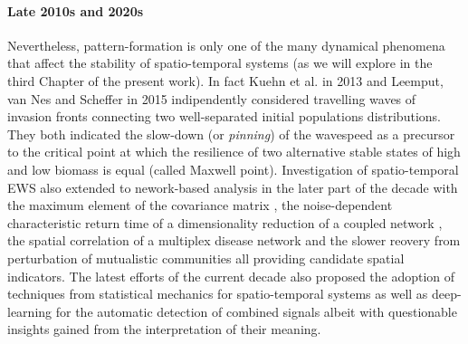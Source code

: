 \documentclass[../main.tex]{subfiles}
\begin{document}
\paragraph{Late 2010s and 2020s}
Nevertheless, pattern-formation is only one of the many dynamical phenomena that affect the stability of spatio-temporal systems (as we will explore in the third Chapter of the present work). 
In fact Kuehn et al. in 2013 \cite{Kuehn13} and Leemput, van Nes and Scheffer in 2015 \cite{Leemput15} indipendently considered travelling waves of invasion fronts connecting two well-separated initial populations distributions. They both indicated the slow-down (or \textit{pinning}) of the wavespeed as a precursor to the critical point at which the resilience of two alternative stable states of high and low biomass is equal (called Maxwell point).
Investigation of spatio-temporal EWS also extended to nework-based analysis in the later part of the decade with the maximum element of the covariance matrix \cite{Suweis14}, the noise-dependent characteristic return time of a dimensionality reduction of a coupled network \cite{Liang17}, the spatial correlation of a multiplex disease network \cite{Jentsch18} and the slower reovery from perturbation of mutualistic communities \cite{Lever20} all providing candidate spatial indicators.
The latest efforts of the current decade also proposed the adoption of techniques from statistical mechanics \cite{Chen19,Gottwald20,Donovan22} for spatio-temporal systems as well as deep-learning \cite{Bury21,Dylewsky23} for the automatic detection of combined signals albeit with questionable insights gained from the interpretation of their meaning.
\end{document}
